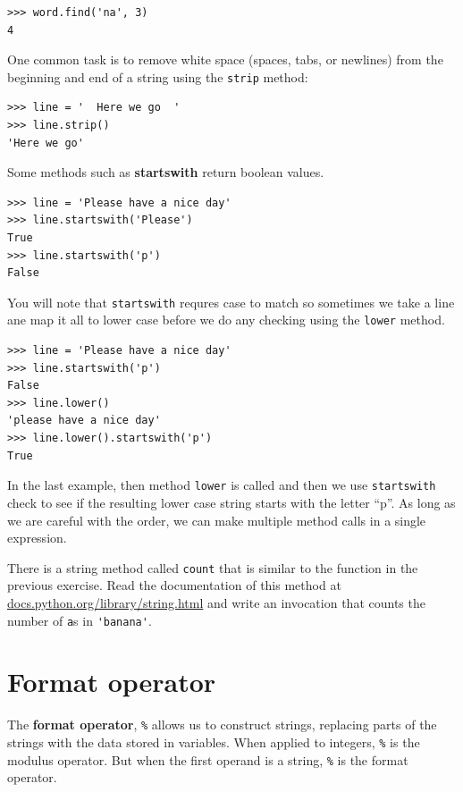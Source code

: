 \documentclass[10pt]{book}
\begin{document}

\beforeverb
\begin{verbatim}
>>> word.find('na', 3)
4
\end{verbatim}
\afterverb
%
One common task is to remove white space (spaces, tabs, or newlines) from
the beginning and end of a string using the {\tt strip} method:

\beforeverb
\begin{verbatim}
>>> line = '  Here we go  '
>>> line.strip()
'Here we go'
\end{verbatim}
\afterverb
%
Some methods such as {\bf startswith} return boolean values.

\beforeverb
\begin{verbatim}
>>> line = 'Please have a nice day'
>>> line.startswith('Please')
True
>>> line.startswith('p')
False
\end{verbatim}
\afterverb
%
You will note that {\tt startswith} requres case to match so sometimes
we take a line ane map it all to lower case before we do any checking
using the {\tt lower} method.

\beforeverb
\begin{verbatim}
>>> line = 'Please have a nice day'
>>> line.startswith('p')
False
>>> line.lower()
'please have a nice day'
>>> line.lower().startswith('p')
True
\end{verbatim}
\afterverb
%
In the last example, then method {\tt lower} is called
and then we use {\tt startswith}
check to see if the resulting lower case string
starts with the letter ``p''.  As long as we are careful
with the order, we can make multiple method calls in a
single expression.

\begin{ex}

There is a string method called {\tt count} that is similar
to the function in the previous exercise.  Read the documentation
of this method at
\url{docs.python.org/library/string.html}
and write an invocation that counts the number of {\tt a}s
in \verb"'banana'".
\end{ex}


\section{Format operator}


The {\bf format operator}, {\tt \%}
allows us to construct strings, replacing parts of the strings
with the data stored in variables.
When applied to integers, {\tt \%} is the modulus operator.  But
when the first operand is a string, {\tt \%} is the format operator.
\end{document}

